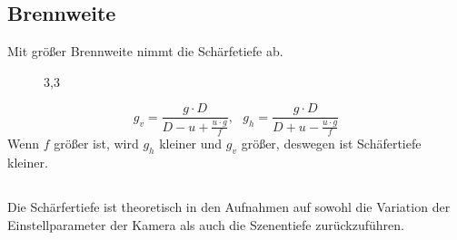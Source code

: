 \documentclass[12pt]{article}
\begin{document}
\subsection{Brennweite}
Mit größer Brennweite nimmt die Schärfetiefe ab. \newline
\begin{figure}[ht]\centering
	\caption{3,3}
\end{figure}
\begin{equation*}
g_{v}=\frac{g \cdot D}{D - u + \frac{u \cdot g}{f}},\ \ \  g_{h}=\frac{g \cdot D}{D + u - \frac{u \cdot g}{f}}
\end{equation*}
Wenn $f$ größer ist, wird $g_h$ kleiner und $g_v$ größer, deswegen ist Schäfertiefe kleiner. 
\subsection{}
Die Schärfertiefe ist theoretisch in den Aufnahmen auf sowohl die Variation der  Einstellparameter der Kamera als auch die Szenentiefe zurückzuführen.
\end{document}
